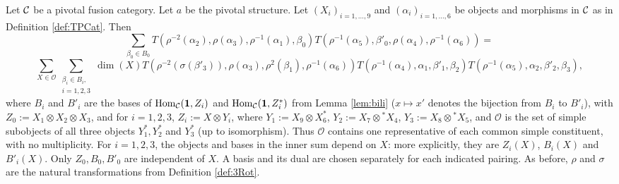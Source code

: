 \documentclass{amsart}
\begin{document}
\begin{theorem}[TPE] \label{thm:TPE}
Let $\mathcal{C}$ be a pivotal fusion category. Let $a$ be the pivotal structure. Let $(X_i)_{i=1,\dots,9}$ and $(\alpha_i)_{i=1,\dots,6}$ be objects and morphisms in $\mathcal{C}$ as in Definition \ref{def:TPCat}. Then  $$
\sum_{\beta_0 \in B_0} T\left(\rho^{-2}(\alpha_2),\rho(\alpha_3),\rho^{-1}(\alpha_1),\beta_0 \right) T\left(\rho^{-1}(\alpha_5),\beta'_0,\rho(\alpha_4),\rho^{-1}(\alpha_6)\right) = $$ $$ \sum_{X \in \mathcal{O}} \sum_{\substack{\beta_i \in B_i, \\ i=1,2,3}} \dim(X) T\left(\rho^{-2}(\sigma(\beta'_3)),\rho(\alpha_3),\rho^2(\beta_1),\rho^{-1}(\alpha_6) \right) T\left(\rho^{-1}(\alpha_4),\alpha_1,\beta'_1,\beta_2\right) T\left(\rho^{-1}(\alpha_5),\alpha_2,\beta'_2,\beta_3\right),$$
where $B_i$ and $B'_i$ are the bases of $\mathrm{Hom}_{\mathcal{C}}({\bf 1},Z_i)$ and $\mathrm{Hom}_{\mathcal{C}}({\bf 1},Z_i^*)$ from Lemma \ref{lem:bili} ($x \mapsto x'$ denotes the bijection from $B_i$ to $B'_i$), with $Z_0 := X_1 \otimes X_2 \otimes X_3$, and for $i=1,2,3$, $Z_i := X \otimes Y_i$, where $Y_1:= X_9 \otimes X_6^{*}$, $Y_2:=X_7 \otimes {}^*X_4$,  $Y_3:=X_8 \otimes {}^*X_5$, and $\mathcal{O}$ is the set of simple subobjects of all three objects $Y_1^*,Y_2^*$ and $Y_3^*$ (up to isomorphism). Thus $\mathcal O$ contains one representative of each common simple constituent, with no multiplicity. For $i=1,2,3$, the objects and bases in the inner sum depend on $X$: more explicitly, they are $Z_i(X)$, $B_i(X)$ and $B'_i(X)$. Only $Z_0,B_0,B'_0$ are independent of $X$. A basis and its dual are chosen separately for each indicated pairing. As before, $\rho$ and $\sigma$ are the natural transformations from Definition \ref{def:3Rot}.
\end{theorem}
\end{document}
